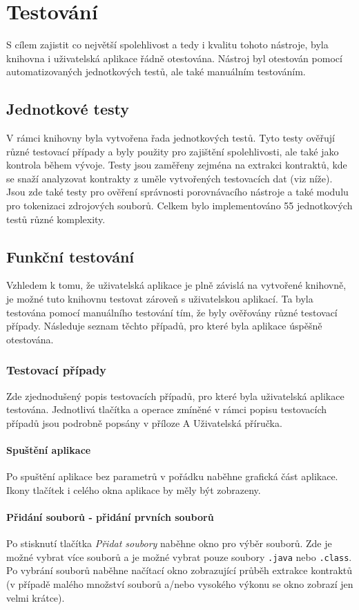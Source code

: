 \chapter{Testování}
	S cílem zajistit co největší spolehlivost a tedy i kvalitu tohoto nástroje, byla knihovna i uživatelská aplikace řádně otestována. Nástroj byl otestován pomocí automatizovaných jednotkových testů, ale také manuálním testováním.
	
	\section{Jednotkové testy}
		V rámci knihovny byla vytvořena řada jednotkových testů. Tyto testy ověřují různé testovací případy a byly použity pro zajištění spolehlivosti, ale také jako kontrola během vývoje. Testy jsou zaměřeny zejména na extrakci kontraktů, kde se snaží analyzovat kontrakty z uměle vytvořených testovacích dat (viz níže). Jsou zde také testy pro ověření správnosti porovnávacího nástroje a také modulu pro tokenizaci zdrojových souborů. Celkem bylo implementováno 55 jednotkových testů různé komplexity.
		
	\section{Funkční testování}
		Vzhledem k tomu, že uživatelská aplikace je plně závislá na vytvořené knihovně, je možné tuto knihovnu testovat zároveň s uživatelskou aplikací. Ta byla testována pomocí manuálního testování tím, že byly ověřovány různé testovací případy. Následuje seznam těchto případů, pro které byla aplikace úspěšně otestována.
		
		\subsection{Testovací případy}	
			Zde zjednodušený popis testovacích případů, pro které byla uživatelská aplikace testována. Jednotlivá tlačítka a operace zmíněné v rámci popisu testovacích případů jsou podrobně popsány v příloze A Uživatelská příručka.
			
			\subsubsection{Spuštění aplikace}
				Po spuštění	aplikace bez parametrů v pořádku naběhne grafická část aplikace. Ikony tlačítek i celého okna aplikace by měly být zobrazeny.
				
			\subsubsection{Přidání souborů - přidání prvních souborů}
				Po stisknutí tlačítka \emph{Přidat soubory} naběhne okno pro výběr souborů. Zde je možné vybrat více souborů a je možné vybrat pouze soubory \texttt{.java} nebo \texttt{.class}.	 Po vybrání souborů naběhne načítací okno zobrazující průběh extrakce kontraktů (v případě malého množství souborů a/nebo vysokého výkonu se okno zobrazí jen velmi krátce).\\
				
